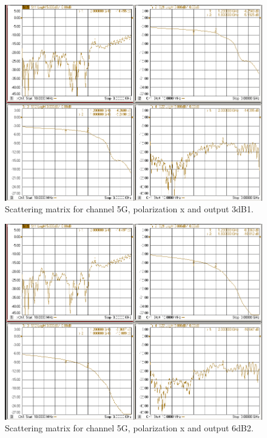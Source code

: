 \documentclass[12pt,a4paper,oneside]{article}
\begin{document}
\begin{figure}[H]
\centering
\includegraphics[width=0.9\linewidth]{VNA_results/5Gx_3dB1.png}
\caption{Scattering matrix for channel 5G, polarization x and output 3dB1.}
\label{fig:5Gx_3dB1}
\end{figure}


\begin{figure}[H]
\centering
\includegraphics[width=0.9\linewidth]{VNA_results/5Gx_6dB2.png}
\caption{Scattering matrix for channel 5G, polarization x and output 6dB2.}
\label{fig:5Gx_6dB2}
\end{figure}
\end{document}
